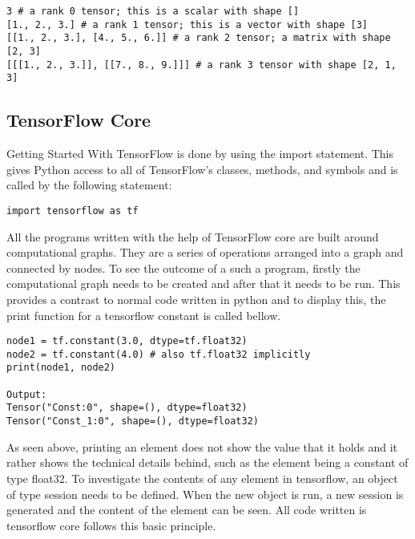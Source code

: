 \begin{adjustbox}{width=\textwidth}
\begin{lstlisting}
3 # a rank 0 tensor; this is a scalar with shape []
[1., 2., 3.] # a rank 1 tensor; this is a vector with shape [3]
[[1., 2., 3.], [4., 5., 6.]] # a rank 2 tensor; a matrix with shape [2, 3]
[[[1., 2., 3.]], [[7., 8., 9.]]] # a rank 3 tensor with shape [2, 1, 3]
\end{lstlisting} 
\end{adjustbox}


\subsection{TensorFlow Core}
Getting Started With TensorFlow is done by using the import statement. 
This gives Python access to all of TensorFlow's classes,
methods, and symbols and is called by the following statement:

\begin{lstlisting}
import tensorflow as tf
\end{lstlisting}

All the programs written with the help of TensorFlow core are built around computational graphs. 
They are a series of operations arranged into a graph and connected by nodes. 
To see the outcome of a such a program, 
firstly the computational graph needs to be created and after that it needs to be run. 
This provides a contrast to normal code written in python and to display this, 
the print function for a tensorflow constant is called bellow.

\begin{lstlisting}
node1 = tf.constant(3.0, dtype=tf.float32)
node2 = tf.constant(4.0) # also tf.float32 implicitly
print(node1, node2)

Output:
Tensor("Const:0", shape=(), dtype=float32)
Tensor("Const_1:0", shape=(), dtype=float32) 
\end{lstlisting}

As seen above, printing an element does not show the value that it holds and it rather shows the technical details behind,
such as the element being a constant of type float32.
To investigate the contents of any element in tensorflow,
an object of type session needs to be defined.
When the new object is run, a new session is generated and the content of the element can be seen.
All code written is tensorflow core follows this basic principle.

